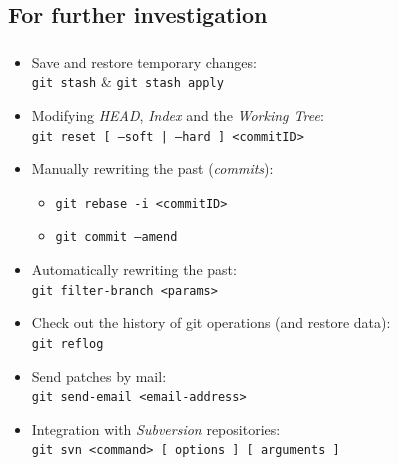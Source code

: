 \subsection{For further investigation}
\begin{frame}
  \frametitle{\insertsubsection}

  \begin{itemize}
  \item Save and restore temporary changes:\\
    \texttt{git stash} \& \texttt{git stash apply}
    \vspacing
  \item Modifying \textit{HEAD}, \textit{Index} and the \textit{Working Tree}:\\
    \texttt{git reset [ --soft | --hard ] <commitID>}
    \vspacing
  \item Manually rewriting the past (\textit{commits}):\\
    \begin{itemize}
    \item \texttt{git rebase -i <commitID>}
    \item \texttt{git commit --amend}
    \end{itemize}
  \item Automatically rewriting the past:\\
    \texttt{git filter-branch <params>}
    \vspacing
  \item Check out the history of git operations (and restore data):\\
    \texttt{git reflog}
    \vspacing
  \item Send patches by mail:\\
    \texttt{git send-email <email-address>}
    \vspacing
  \item Integration with \textit{Subversion} repositories:\\
    \texttt{git svn <command> [ options ] [ arguments ]}
    \vspacing
  \end{itemize}
\end{frame}

